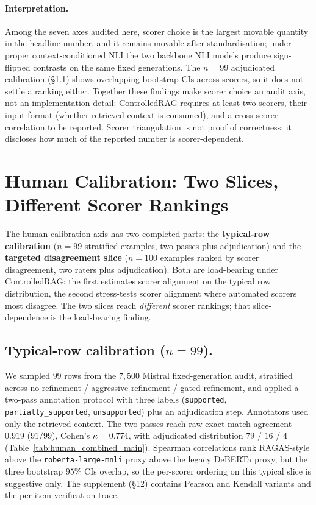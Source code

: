 \paragraph{Interpretation.} Among the seven axes audited here,
scorer choice is the largest movable quantity in the headline
number, and it remains movable after standardisation; under proper
context-conditioned NLI the two backbone NLI models produce
sign-flipped contrasts on the same fixed generations. The $n=99$ adjudicated calibration
(\S\ref{sec:human_cal_99}) shows overlapping bootstrap CIs across
scorers, so it does not settle a ranking either. Together these
findings make scorer choice an audit axis, not an implementation
detail: ControlledRAG requires at least two scorers, their input
format (whether retrieved context is consumed), and a cross-scorer
correlation to be reported. Scorer triangulation is not proof of
correctness; it discloses how much of the reported number is
scorer-dependent.

\section{Human Calibration: Two Slices, Different Scorer Rankings}
\label{sec:human_cal}

The human-calibration axis has two completed parts: the
\textbf{typical-row calibration} ($n=99$ stratified examples,
two passes plus adjudication) and the \textbf{targeted disagreement
slice} ($n=100$ examples ranked by scorer disagreement, two raters
plus adjudication). Both are load-bearing under ControlledRAG: the
first estimates scorer alignment on the typical row distribution,
the second stress-tests scorer alignment where automated scorers
most disagree. The two slices reach \emph{different} scorer
rankings; that slice-dependence is the load-bearing finding.

\subsection{Typical-row calibration ($n=99$).}
\label{sec:human_cal_99}

We sampled $99$ rows from the $7{,}500$ Mistral fixed-generation
audit, stratified across no-refinement / aggressive-refinement /
gated-refinement, and
applied a two-pass annotation protocol with three labels
(\texttt{supported}, \texttt{partially\_supported},
\texttt{unsupported}) plus an adjudication step. Annotators used only
the retrieved context. The two passes reach raw exact-match agreement
$0.919$ ($91/99$), Cohen's $\kappa = 0.774$, with adjudicated
distribution $79$ / $16$ / $4$
(Table~\ref{tab:human_combined_main}). Spearman correlations rank
RAGAS-style above the \texttt{roberta-large-mnli} proxy above the
legacy DeBERTa proxy, but the three bootstrap $95\%$ CIs overlap, so
the per-scorer ordering on this typical slice is suggestive only. The
supplement (\S 12) contains Pearson and Kendall variants and the
per-item verification trace.

